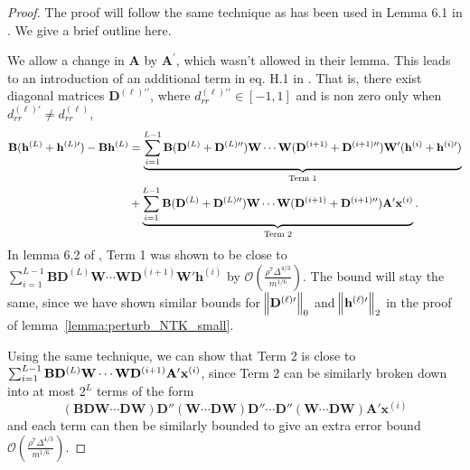 \begin{proof}
	The proof will follow the same technique as has been used in Lemma 6.1 in \cite{allen2019can}. We give a brief outline here. 
	
	We allow a change in $\mathbf{A}$ by $\mathbf{A}^{\prime}$, which wasn't allowed in their lemma. This leads to an introduction of an additional term in eq. H.1 in \cite{allen2019can}. That is, there exist diagonal matrices $\mathbf{D}^{(\ell)\prime\prime}$, where $d^{(\ell)\prime\prime}_{rr} \in [-1, 1]$ and is non zero only when $d^{(\ell)\prime}_{rr} \ne d^{(\ell)}_{rr}$, 
	\begin{align*}
		\mathbf{B} (\mathbf{h}^{(L)} + \mathbf{h}^{(L)\prime}) -  \mathbf{B} \mathbf{h}^{(L)} &= \underbrace{\sum_{i=1}^{L-1} \mathbf{B} (\mathbf{D}^{(L)} + \mathbf{D}^{(L)\prime\prime}) \mathbf{W} \cdots \mathbf{W} (\mathbf{D}^{(i+1)} + \mathbf{D}^{(i+1)\prime\prime}) \mathbf{W}' (\mathbf{h}^{(i)} + \mathbf{h}^{(i)\prime})}_{\text{Term 1}} \\&
		+ \underbrace{\sum_{i=1}^{L-1} \mathbf{B} (\mathbf{D}^{(L)} + \mathbf{D}^{(L)\prime\prime}) \mathbf{W} \cdots \mathbf{W} (\mathbf{D}^{(i+1)} + \mathbf{D}^{(i+1)\prime\prime}) \mathbf{A}' \mathbf{x}^{(i)}}_{\text{Term 2}}.
	\end{align*}
	In lemma 6.2 of \cite{allen2019can}, Term 1 was shown to be close to \\ $\sum_{i=1}^{L-1} \mathbf{B} \mathbf{D}^{(L)} \mathbf{W} \cdots \mathbf{W} \mathbf{D}^{(i+1)} \mathbf{W}' \mathbf{h}^{(i)}$  by $\mathcal{O}(\frac{\rho^7 \Delta^{4/3}}{m^{1/6}})$. The bound will stay the same, since we have shown similar bounds for $\norm{\mathbf{D}^{(\ell)\prime}}_0$ and $\norm{\mathbf{h}^{(\ell)\prime}}_2$ in the proof of lemma~\ref{lemma:perturb_NTK_small}. 
	
	Using the same technique, we can show that Term 2 is close to $\sum_{i=1}^{L-1} \mathbf{B} \mathbf{D}^{(L)}  \mathbf{W} \cdots \mathbf{W} \mathbf{D}^{(i+1)} \mathbf{A}' \mathbf{x}^{(i)}$, since Term 2 can be similarly broken down into at most $2^L$ terms of the form $$(\mathbf{B}\mathbf{D}\mathbf{W}\cdots\mathbf{D}\mathbf{W})\mathbf{D}'' (\mathbf{W}\cdots\mathbf{D}\mathbf{W})\mathbf{D}'' \cdots \mathbf{D}'' (\mathbf{W}\cdots\mathbf{D}\mathbf{W}) \mathbf{A}'\mathbf{x}^{(i)}$$ and each term can then be similarly bounded to give an extra error bound $\mathcal{O}(\frac{\rho^7 \Delta^{4/3}}{m^{1/6}})$.
\end{proof}




